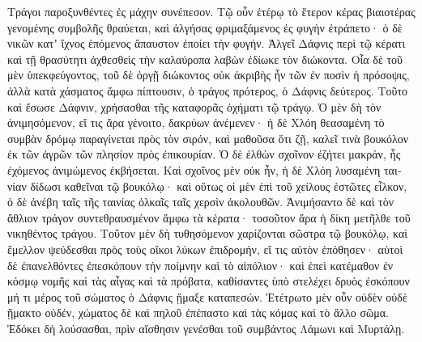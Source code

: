 \documentclass{book}
\begin{document}
\begin{pairs}
\begin{Leftside}
\begin{greek}
  Τράγοι παροξυνθέντες ἐς μάχην συνέπεσον. Τῷ οὖν ἑτέρῳ τὸ ἕτερον κέρας βιαιοτέρας γενομένης συμβολῆς θραύεται, καὶ ἀλγήσας φριμαξάμενος ἐς φυγὴν ἐτράπετο· ὁ δὲ νικῶν κατʼ ἴχνος ἑπόμενος ἄπαυστον ἐποίει τὴν φυγήν. Ἀλγεῖ Δάφνις περὶ τῷ κέρατι καὶ τῇ θρασύτητι ἀχθεσθεὶς τὴν καλαύροπα λαβὼν ἐδίωκε τὸν διώκοντα.  Οἷα δὲ τοῦ μὲν ὑπεκφεύγοντος, τοῦ δὲ ὀργῇ διώκοντος οὐκ ἀκριβὴς ἦν τῶν ἐν ποσὶν ἡ πρόσοψις, ἀλλὰ κατὰ χάσματος ἄμφω πίπτουσιν, ὁ τράγος πρότερος, ὁ Δάφνις δεύτερος. Τοῦτο καὶ ἔσωσε Δάφνιν, χρήσασθαι τῆς καταφορᾶς ὀχήματι τῷ τράγῳ.  Ὁ μὲν δὴ τὸν ἀνιμησόμενον, εἴ τις ἄρα γένοιτο, δακρύων ἀνέμενεν· ἡ δὲ Χλόη θεασαμένη τὸ συμβὰν δρόμῳ παραγίνεται πρὸς τὸν σιρόν, καὶ μαθοῦσα ὅτι ζῇ, καλεῖ τινὰ βουκόλον ἐκ τῶν ἀγρῶν τῶν πλησίον πρὸς ἐπικουρίαν.  Ὁ δὲ ἐλθὼν σχοῖνον ἐζήτει μακράν, ἧς ἐχόμενος ἀνιμώμενος ἐκβήσεται. Καὶ σχοῖνος μὲν οὐκ ἦν, ἡ δὲ Χλόη λυσαμένη ταινίαν δίδωσι καθεῖναι τῷ βουκόλῳ· καὶ οὕτως οἱ μὲν ἐπὶ τοῦ χείλους ἑστῶτες εἷλκον, ὁ δὲ ἀνέβη ταῖς τῆς ταινίας ὁλκαῖς ταῖς χερσὶν ἀκολουθῶν.  Ἀνιμήσαντο δὲ καὶ τὸν ἄθλιον τράγον συντεθραυσμένον ἄμφω τὰ κέρατα· τοσοῦτον ἄρα ἡ δίκη μετῆλθε τοῦ νικηθέντος τράγου. Τοῦτον μὲν δὴ τυθησόμενον χαρίζονται σῶστρα τῷ βουκόλῳ, καὶ ἔμελλον ψεύδεσθαι πρὸς τοὺς οἴκοι λύκων ἐπιδρομήν, εἴ τις αὐτὸν ἐπόθησεν· αὐτοὶ δὲ ἐπανελθόντες ἐπεσκόπουν τὴν ποίμνην καὶ τὸ αἰπόλιον· καὶ ἐπεὶ κατέμαθον ἐν κόσμῳ νομῆς καὶ τὰς αἶγας καὶ τὰ πρόβατα, καθίσαντες ὑπὸ στελέχει δρυὸς ἐσκόπουν μή τι μέρος τοῦ σώματος ὁ Δάφνις ᾕμαξε καταπεσών.  Ἐτέτρωτο μὲν οὖν οὐδὲν οὐδὲ ᾕμακτο οὐδέν, χώματος δὲ καὶ πηλοῦ ἐπέπαστο καὶ τὰς κόμας καὶ τὸ ἄλλο σῶμα. Ἐδόκει δὴ λούσασθαι, πρὶν αἴσθησιν γενέσθαι τοῦ συμβάντος Λάμωνι καὶ Μυρτάλῃ.
\pend



\end{greek}
\end{Leftside}
\end{pairs}
\end{document}

